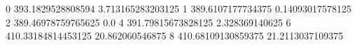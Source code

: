 0 393.1829528808594 3.713165283203125
1 389.6107177734375 0.14093017578125
2 389.46978759765625 0.0
4 391.79815673828125 2.328369140625
6 410.33184814453125 20.862060546875
8 410.68109130859375 21.2113037109375
